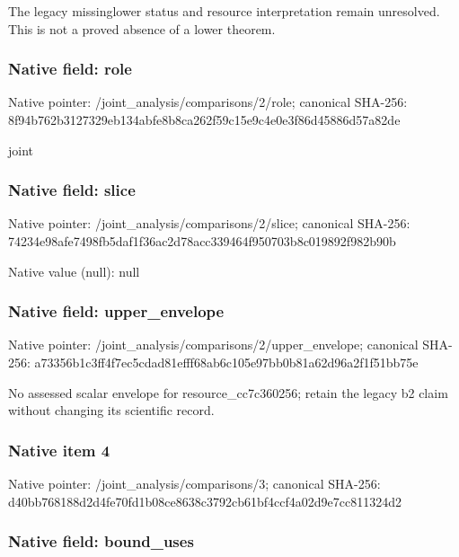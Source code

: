\documentclass[10pt,a4paper]{article}
\begin{document}
The legacy missinglower status and resource interpretation remain unresolved. This is not a proved absence of a lower theorem.


\subsubsection{Native field: role}


Native pointer: /joint\_analysis/comparisons/2/role; canonical SHA-256: 8f94b762b3127329eb134abf\allowbreak{}e8b8ca262f59c15e9c4e0e3f\allowbreak{}86d45886d57a82de


joint


\subsubsection{Native field: slice}


Native pointer: /joint\_analysis/comparisons/2/slice; canonical SHA-256: 74234e98afe7498fb5daf1f3\allowbreak{}6ac2d78acc339464f950703b\allowbreak{}8c019892f982b90b



Native value (null): null



\subsubsection{Native field: upper\_envelope}


Native pointer: /joint\_analysis/comparis\allowbreak{}ons/2/upper\_envelope; canonical SHA-256: a73356b1c3ff4f7ec5cdad81\allowbreak{}efff68ab6c105e97bb0b81a6\allowbreak{}2d96a2f1f51bb75e


No assessed scalar envelope for resource\_cc7c360256; retain the legacy b2 claim without changing its scientific record.


\subsubsection{Native item 4}


Native pointer: /joint\_analysis/comparisons/3; canonical SHA-256: d40bb768188d2d4fe70fd1b0\allowbreak{}8ce8638c3792cb61bf4ccf4a\allowbreak{}02d9e7cc811324d2



\subsubsection{Native field: bound\_uses}
\end{document}
